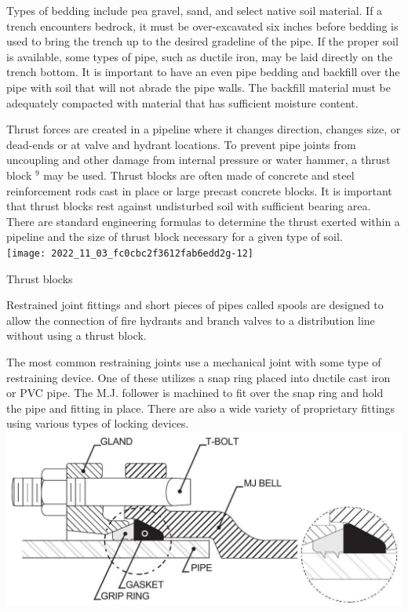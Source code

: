 \documentclass[10pt]{article}
\begin{document}
Types of bedding include pea gravel, sand, and select native soil material. If a trench encounters bedrock, it must be over-excavated six inches before bedding is used to bring the trench up to the desired gradeline of the pipe. If the proper soil is available, some types of pipe, such as ductile iron, may be laid directly on the trench bottom. It is important to have an even pipe bedding and backfill over the pipe with soil that will not abrade the pipe walls. The backfill material must be adequately compacted with material that has sufficient moisture content.

Thrust forces are created in a pipeline where it changes direction, changes size, or dead-ends or at valve and hydrant locations. To prevent pipe joints from uncoupling and other damage from internal pressure or water hammer, a thrust block ${ }^{9}$ may be used. Thrust blocks are often made of concrete and steel reinforcement rods cast in place or large precast concrete blocks. It is important that thrust blocks rest against undisturbed soil with sufficient bearing area. There are standard engineering formulas to determine the thrust exerted within a pipeline and the size of thrust block necessary for a given type of soil.\\

\texttt{[image: 2022\_11\_03\_fc0cbc2f3612fab6edd2g-12]}

Thrust blocks

Restrained joint fittings and short pieces of pipes called spools are designed to allow the connection of fire hydrants and branch valves to a distribution line without using a thrust block.

The most common restraining joints use a mechanical joint with some type of restraining device. One of these utilizes a snap ring placed into ductile cast iron or PVC pipe. The M.J. follower is machined to fit over the snap ring and hold the pipe and fitting in place. There are also a wide variety of proprietary fittings using various types of locking devices.\\

\includegraphics[max width=\textwidth]{2022_11_03_fc0cbc2f3612fab6edd2g-13}
\end{document}
